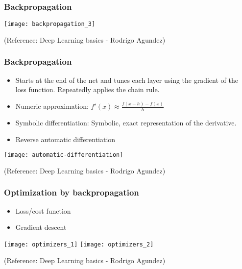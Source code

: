 \begin{frame}[fragile] \frametitle{Backpropagation}

\begin{center}
\texttt{[image: backpropagation\_3]}

\end{center}

\tiny{(Reference: Deep Learning basics - Rodrigo Agundez)}

\end{frame}

\begin{frame}[fragile] \frametitle{Backpropagation}


\begin{itemize}
\item Starts at the end of the net and tunes each layer using the gradient of the loss function. Repeatedly applies the chain rule. 

\item Numeric approximation: $f'(x) \approx \frac{f(x+h) - f(x)}{h}$

\item Symbolic differentiation: Symbolic, exact representation of the derivative.

\item Reverse automatic differentiation
\end{itemize}


\begin{center}
\texttt{[image: automatic-differentiation]}
\end{center}

\tiny{(Reference: Deep Learning basics - Rodrigo Agundez)}

\end{frame}

\begin{frame}[fragile] \frametitle{Optimization by backpropagation}
\begin{itemize}
\item Loss/cost function
\item Gradient descent
\end{itemize}

\begin{center}
\texttt{[image: optimizers\_1]}
\texttt{[image: optimizers\_2]}
\end{center}

\tiny{(Reference: Deep Learning basics - Rodrigo Agundez)}

\end{frame}


